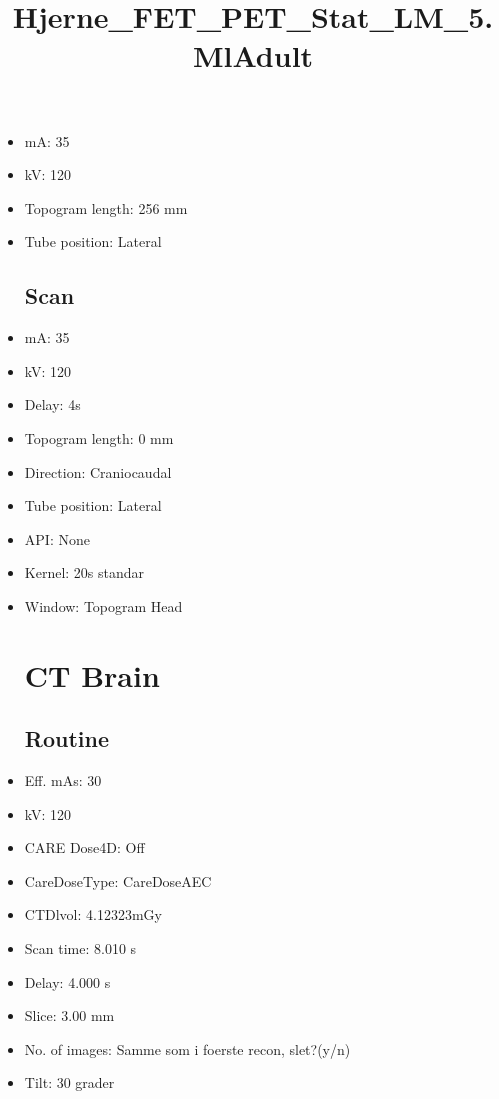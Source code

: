 \documentclass[12pt]{article}
\title{Hjerne\_FET\_PET\_Stat\_LM\_5.MlAdult}
\begin{document}
\maketitle
\newpage
\tableofcontents
\newpage
{}


\begin{itemize}\section{Topogram}
\subsection{Routine}
\item mA: 35\item kV: 120\item Topogram length: 256 mm\item Tube position: Lateral
\subsection{Scan}\item mA: 35\item kV: 120\item Delay: 4s\item Topogram length: 0 mm\item Direction: Craniocaudal\item Tube position: Lateral\item API: None\item Kernel: 20s standar\item Window: Topogram Head
\section{CT Brain}
\subsection{Routine}
\item Eff. mAs: 30\item kV: 120\item CARE Dose4D: Off\item CareDoseType: CareDoseAEC\item CTDlvol: 4.12323mGy\item Scan time: 8.010 s\item Delay: 4.000 s\item Slice: 3.00 mm\item No. of images: Samme som i foerste recon, slet?(y/n)\item Tilt: 30 grader

\end{itemize}
\end{document}

